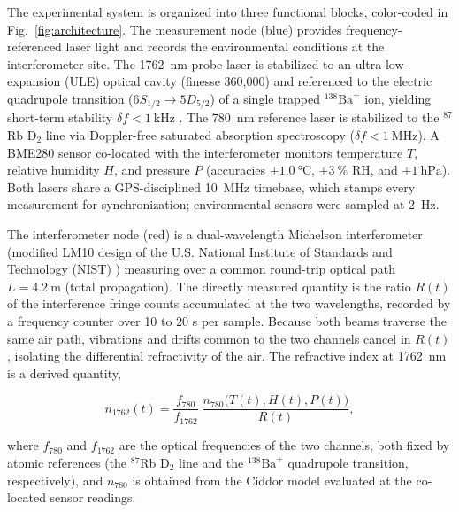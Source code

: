 \documentclass[aps,prapplied,reprint,groupedaddress,twocolumn,superscriptaddress,linenumbers]{revtex4-2}
\begin{document}
The experimental system is organized into three functional blocks, color-coded in Fig.~\ref{fig:architecture}. The measurement node (blue) provides frequency-referenced laser light and records the environmental conditions at the interferometer site. The \SI{1762}{\nano\meter} probe laser is stabilized to an ultra-low-expansion (ULE) optical cavity (finesse 360,000) and referenced to the electric quadrupole transition ($6S_{1/2} \rightarrow 5D_{5/2}$) of a single trapped $^{138}\mathrm{Ba}^+$ ion, yielding short-term stability $\delta f < \SI{1}{\kilo\hertz}$ \cite{yum2017optical,arnold2020precision}. The \SI{780}{\nano\meter} reference laser is stabilized to the $^{87}$Rb D$_2$ line via Doppler-free saturated absorption spectroscopy ($\delta f < \SI{1}{\mega\hertz}$). A BME280 sensor \cite{bme280} co-located with the interferometer monitors temperature $T$, relative humidity $H$, and pressure $P$ (accuracies $\pm\SI{1.0}{\degreeCelsius}$, $\pm\SI{3}{\percent}$ RH, and $\pm\SI{1}{\hecto\pascal}$). Both lasers share a GPS-disciplined \SI{10}{\mega\hertz} timebase, which stamps every measurement for synchronization; environmental sensors were sampled at \SI{2}{\hertz}.

The interferometer node (red) is a dual-wavelength Michelson interferometer (modified LM10 design of the U.S. National Institute of Standards and Technology (NIST) \cite{fox1999reliable}) measuring over a common round-trip optical path $L = \SI{4.2}{\meter}$ (total propagation). The directly measured quantity is the ratio $R(t)$ of the interference fringe counts accumulated at the two wavelengths, recorded by a frequency counter over 10 to 20 s per sample. Because both beams traverse the same air path, vibrations and drifts common to the two channels cancel in $R(t)$, isolating the differential refractivity of the air. The refractive index at \SI{1762}{\nano\meter} is a derived quantity,

\begin{equation}
n_{1762}(t) = \frac{f_{780}}{f_{1762}}\; \frac{n_{780}\big(T(t),H(t),P(t)\big)}{R(t)},
\label{eqn:wavemeter}
\end{equation}

where $f_{780}$ and $f_{1762}$ are the optical frequencies of the two channels, both fixed by atomic references (the $^{87}$Rb D$_2$ line and the $^{138}\mathrm{Ba}^+$ quadrupole transition, respectively), and $n_{780}$ is obtained from the Ciddor model \cite{ciddor1996refractive} evaluated at the co-located sensor readings.
\end{document}
